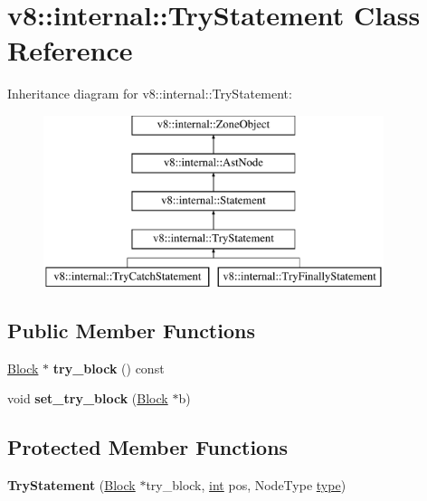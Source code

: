 \hypertarget{classv8_1_1internal_1_1TryStatement}{}\section{v8\+:\+:internal\+:\+:Try\+Statement Class Reference}
\label{classv8_1_1internal_1_1TryStatement}
Inheritance diagram for v8\+:\+:internal\+:\+:Try\+Statement\+:\begin{figure}[H]
\begin{center}
\leavevmode
\includegraphics[height=5.000000cm]{classv8_1_1internal_1_1TryStatement}
\end{center}
\end{figure}
\subsection*{Public Member Functions}
\begin{DoxyCompactItemize}
\item 
\mbox{\label{classv8_1_1internal_1_1TryStatement_affba507eef1c542d0986c7b3a15ffe11}} 
\mbox{\hyperlink{classv8_1_1internal_1_1Block}{Block}} $\ast$ {\bfseries try\+\_\+block} () const
\item 
\mbox{\label{classv8_1_1internal_1_1TryStatement_a49611afe2e591ab3589e58d02651d182}} 
void {\bfseries set\+\_\+try\+\_\+block} (\mbox{\hyperlink{classv8_1_1internal_1_1Block}{Block}} $\ast$b)
\end{DoxyCompactItemize}
\subsection*{Protected Member Functions}
\begin{DoxyCompactItemize}
\item 
\mbox{\label{classv8_1_1internal_1_1TryStatement_ab594fb379334ac61d36984b70ae0adc2}} 
{\bfseries Try\+Statement} (\mbox{\hyperlink{classv8_1_1internal_1_1Block}{Block}} $\ast$try\+\_\+block, \mbox{\hyperlink{classint}{int}} pos, Node\+Type \mbox{\hyperlink{classstd_1_1conditional_1_1type}{type}})
\end{DoxyCompactItemize}
